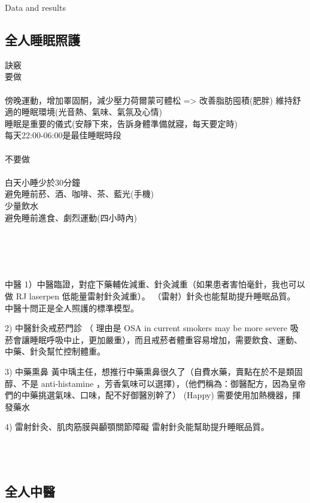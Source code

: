 \documentclass[aspectratio=169]{beamer}
\begin{document}
\begin{frame}{Data and results}
\subsection{全人睡眠照護}
\begin{block}{訣竅}
~~\\
要做\\
~~\\
傍晚運動，增加睪固酮，減少壓力荷爾蒙可體松 => 改善脂肪囤積(肥胖)
維持舒適的睡眠環境(光音熱、氣味、氣氛及心情)\\
睡眠是重要的儀式(安靜下來，告訴身體準備就寢，每天要定時)\\
每天22:00-06:00是最佳睡眠時段\\

~~\\
不要做\\
~~\\
白天小睡少於30分鐘\\
避免睡前菸、酒、咖啡、茶、藍光(手機)\\
少量飲水\\
避免睡前進食、劇烈運動(四小時內)\\
~~\\
~~\\
\end{block}
\end{frame}

\begin{frame}
~~\\
~~\\
中醫
1）中醫臨證，對症下藥輔佐減重、針灸減重（如果患者害怕毫針，我也可以做 RJ laserpen 低能量雷射針灸減重）。
（雷射）針灸也能幫助提升睡眠品質。
中醫十問正是全人照護的標準模型。

2) 中醫針灸戒菸門診 （ 理由是 OSA in current smokers may be more severe 吸菸會讓睡眠呼吸中止，更加嚴重），而且戒菸者體重容易增加，需要飲食、運動、中藥、針灸幫忙控制體重。

3) 中藥熏鼻
黃中瑀主任，想推行中藥熏鼻很久了（自費水藥，賣點在於不是類固醇、不是 anti-histamine ，芳香氣味可以選擇），（他們稱為：御醫配方，因為皇帝們的中藥挑選氣味、口味，配不好御醫別幹了） (Happy)
需要使用加熱機器，揮發藥水

4) 雷射針灸、肌肉筋膜與顳顎關節障礙
雷射針灸能幫助提升睡眠品質。

~~\\
~~\\
\end{frame}

\subsection{全人中醫}%
\end{document}
